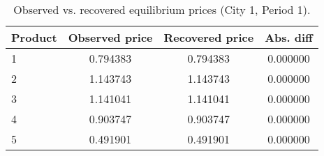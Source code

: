 \begin{table}[H]
\centering
\caption{Observed vs. recovered equilibrium prices (City 1, Period 1).}
\begin{tabular}{lccc}
\toprule
Product & Observed price & Recovered price & Abs. diff \\
\midrule
1 & 0.794383 & 0.794383 & 0.000000 \\
2 & 1.143743 & 1.143743 & 0.000000 \\
3 & 1.141041 & 1.141041 & 0.000000 \\
4 & 0.903747 & 0.903747 & 0.000000 \\
5 & 0.491901 & 0.491901 & 0.000000 \\
\bottomrule
\end{tabular}
\label{tab:q15_recover_c1t1}
\end{table}

